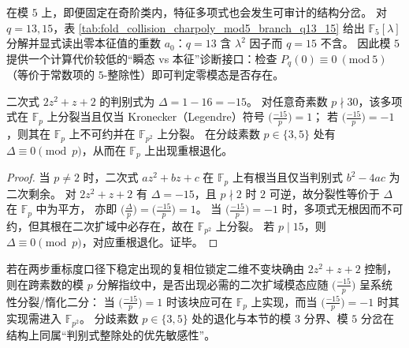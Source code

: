 \begin{remark}\label{rem:pom-charpoly-mod5-branch}
在模 \(5\) 上，即便固定在奇阶类内，特征多项式也会发生可审计的结构分岔。
对 \(q=13,15\)，表 \ref{tab:fold_collision_charpoly_mod5_branch_q13_15} 给出 \(\mathbb{F}_5[\lambda]\) 分解并显式读出零本征值的重数 \(a_0\)：\(q=13\) 含 \(\lambda^2\) 因子而 \(q=15\) 不含。
因此模 \(5\) 提供一个计算代价较低的“瞬态 vs 本征”诊断接口：检查 \(P_q(0)\equiv 0\ (\mathrm{mod}\ 5)\)（等价于常数项的 \(5\)-整除性）即可判定零模态是否存在。
\end{remark}

\begin{proposition}\label{prop:pom-phase-lock-discriminant-minus15-splitting}
二次式 \(2z^2+z+2\) 的判别式为 \(\Delta=1-16=-15\)。
对任意奇素数 \(p\nmid 30\)，该多项式在 \(\mathbb{F}_p\) 上分裂当且仅当 Kronecker（Legendre）符号 \(\bigl(\frac{-15}{p}\bigr)=1\)；
若 \(\bigl(\frac{-15}{p}\bigr)=-1\)，则其在 \(\mathbb{F}_p\) 上不可约并在 \(\mathbb{F}_{p^{2}}\) 上分裂。
在分歧素数 \(p\in\{3,5\}\) 处有 \(\Delta\equiv 0\pmod p\)，从而在 \(\mathbb{F}_p\) 上出现重根退化。
\end{proposition}
\begin{proof}
当 \(p\ne 2\) 时，二次式 \(az^2+bz+c\) 在 \(\mathbb{F}_p\) 上有根当且仅当判别式 \(b^2-4ac\) 为二次剩余。
对 \(2z^2+z+2\) 有 \(\Delta=-15\)，且 \(p\nmid 2\) 时 \(2\) 可逆，故分裂性等价于 \(\Delta\) 在 \(\mathbb{F}_p\) 中为平方，
亦即 \(\bigl(\frac{\Delta}{p}\bigr)=\bigl(\frac{-15}{p}\bigr)=1\)。
当 \(\bigl(\frac{-15}{p}\bigr)=-1\) 时，多项式无根因而不可约，但其根在二次扩域中必存在，故在 \(\mathbb{F}_{p^2}\) 上分裂。
若 \(p\mid 15\)，则 \(\Delta\equiv 0\pmod p\)，对应重根退化。证毕。
\end{proof}

\begin{remark}\label{rem:pom-phase-lock-discriminant-minus15-prediction}
若在两步重标度口径下稳定出现的复相位锁定二维不变块确由 \(2z^2+z+2\) 控制，
则在跨素数的模 \(p\) 分解指纹中，是否出现必需的二次扩域模态应随 \(\bigl(\frac{-15}{p}\bigr)\) 呈系统性分裂/惰化二分：
当 \(\bigl(\frac{-15}{p}\bigr)=1\) 时该块应可在 \(\mathbb{F}_p\) 上实现，而当 \(\bigl(\frac{-15}{p}\bigr)=-1\) 时其实现需进入 \(\mathbb{F}_{p^2}\)。
分歧素数 \(p\in\{3,5\}\) 处的退化与本节的模 \(3\) 分界、模 \(5\) 分岔在结构上同属“判别式整除处的优先敏感性”。
\end{remark}

